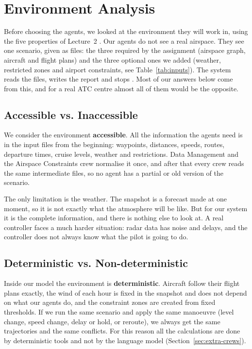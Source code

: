 \section{Environment Analysis}
\label{sec:environment}

Before choosing the agents, we looked at the environment they will work in, using the five
properties of Lecture~2 \cite{lecture2, wooldridge2009}. Our agents do not see a real airspace. They see one scenario, given as files: the
three required by the assignment (airspace graph, aircraft and flight plans) and the three
optional ones we added (weather, restricted zones and airport constraints, see
Table~\ref{tab:inputs}). The system reads the files, writes the report and stops
\cite{mas_assignment}. Most of our answers below come from this, and for a real ATC centre
almost all of them would be the opposite.

\subsection{Accessible vs. Inaccessible}

We consider the environment \textbf{accessible}. All the information the agents need is in
the input files from the beginning: waypoints, distances, speeds, routes, departure times,
cruise levels, weather and restrictions. Data Management and the Airspace Constraints crew normalise it once, and after that
every crew reads the same intermediate files, so no agent has a partial or old version of
the scenario.

The only limitation is the weather. The snapshot is a forecast made at one moment, so it is not
exactly what the atmosphere will be like. But for our system it is the complete
information, and there is nothing else to look at. A real controller faces a much harder situation:
radar data has noise and delays, and the controller does not always know what the pilot is
going to do.

\subsection{Deterministic vs. Non-deterministic}

Inside our model the environment is \textbf{deterministic}. Aircraft follow their flight
plans exactly, the wind of each hour is fixed in the snapshot and does not depend on what our agents do, and the constraint zones are
created from fixed thresholds. If we run the same scenario and apply the same manoeuvre
(level change, speed change, delay or hold, or reroute), we always get the same
trajectories and the same conflicts. For this reason all the calculations are done by
deterministic tools and not by the language model (Section~\ref{sec:extra-crews}).

